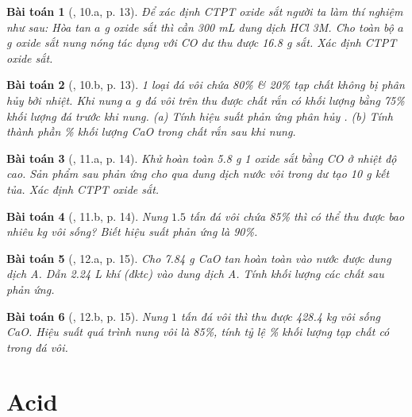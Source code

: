\documentclass{article}
\newtheorem{baitoan}{Bài toán}
\begin{document}
\begin{baitoan}[\cite{An_350_BT_Hoa_Hoc_9}, 10.a, p. 13]
	Để xác định CTPT oxide sắt người ta làm thí nghiệm như sau: Hòa tan $a$ \emph{g} oxide sắt thì cần \emph{300 mL} dung dịch \emph{HCl 3M}. Cho toàn bộ $a$ \emph{g} oxide sắt nung nóng tác dụng với \emph{CO} dư thu được \emph{16.8 g} sắt. Xác định CTPT oxide sắt.
\end{baitoan}

\begin{baitoan}[\cite{An_350_BT_Hoa_Hoc_9}, 10.b, p. 13]
	1 loại đá vôi chứa \emph{80\% } \& \emph{20\%} tạp chất không bị phân hủy bởi nhiệt. Khi nung $a$ \emph{g} đá vôi trên thu được chất rắn có khối lượng bằng \emph{75\%} khối lượng đá trước khi nung. (a) Tính hiệu suất phản ứng phân hủy \emph{}. (b) Tính thành phần \% khối lượng \emph{CaO} trong chất rắn sau khi nung.
\end{baitoan}

\begin{baitoan}[\cite{An_350_BT_Hoa_Hoc_9}, 11.a, p. 14]
	Khử hoàn toàn \emph{5.8 g} 1 oxide sắt bằng \emph{CO} ở nhiệt độ cao. Sản phẩm sau phản ứng cho qua dung dịch nước vôi trong dư tạo \emph{10 g} kết tủa. Xác định CTPT oxide sắt.
\end{baitoan}

\begin{baitoan}[\cite{An_350_BT_Hoa_Hoc_9}, 11.b, p. 14]
	Nung $1.5$ tấn đá vôi chứa \emph{85\% } thì có thể thu được bao nhiêu \emph{kg} vôi sống? Biết hiệu suất phản ứng là \emph{90\%}.
\end{baitoan}

\begin{baitoan}[\cite{An_350_BT_Hoa_Hoc_9}, 12.a, p. 15]
	Cho \emph{7.84 g CaO} tan hoàn toàn vào nước được dung dịch A. Dẫn \emph{2.24 L} khí \emph{} (đktc) vào dung dịch A. Tính khối lượng các chất sau phản ứng.
\end{baitoan}

\begin{baitoan}[\cite{An_350_BT_Hoa_Hoc_9}, 12.b, p. 15]
	Nung $1$ tấn đá vôi thì thu được \emph{428.4 kg} vôi sống \emph{CaO}. Hiệu suất quá trình nung vôi là \emph{85\%}, tính tỷ lệ \emph{\%} khối lượng tạp chất có trong đá vôi.
\end{baitoan}


\section{Acid}
\end{document}
